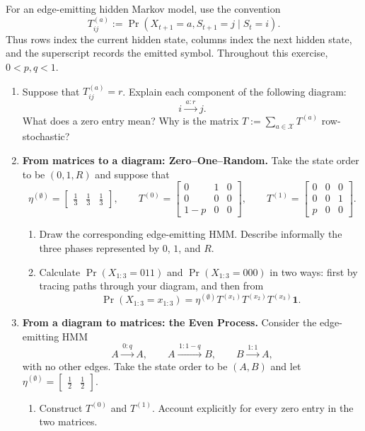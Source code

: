 \begin{exercise}
\label{ex:p3-1}
  For an edge-emitting hidden Markov model, use the convention
  \[
    T^{(a)}_{ij}
      :=\Pr(X_{t+1}=a,S_{t+1}=j\mid S_t=i).
  \]
  Thus rows index the current hidden state, columns index the next hidden
  state, and the superscript records the emitted symbol. Throughout this
  exercise, $0<p,q<1$.

  \begin{enumerate}
    \item Suppose that $T^{(a)}_{ij}=r$. Explain each component of the
      following diagram:
      \[
        i\xrightarrow{\,a:r\,}j.
      \]
      What does a zero entry mean? Why is the matrix
      $T:=\sum_{a\in\mathcal X}T^{(a)}$ row-stochastic?

    \item \textbf{From matrices to a diagram: Zero--One--Random.}
      Take the state order to be $(0,1,R)$ and suppose that
      \[
        \eta^{(\emptyset)}
          =\begin{bmatrix}\tfrac13&\tfrac13&\tfrac13\end{bmatrix},
        \qquad
        T^{(0)}=
        \begin{bmatrix}
          0&1&0\\
          0&0&0\\
          1-p&0&0
        \end{bmatrix},
        \qquad
        T^{(1)}=
        \begin{bmatrix}
          0&0&0\\
          0&0&1\\
          p&0&0
        \end{bmatrix}.
      \]
      \begin{enumerate}
        \item Draw the corresponding edge-emitting HMM. Describe informally
          the three phases represented by $0$, $1$, and $R$.

        \item Calculate $\Pr(X_{1:3}=011)$ and
          $\Pr(X_{1:3}=000)$ in two ways: first by tracing paths through your
          diagram, and then from
          \[
            \Pr(X_{1:3}=x_{1:3})
              =\eta^{(\emptyset)}
                T^{(x_1)}T^{(x_2)}T^{(x_3)}\mathbf 1.
          \]
      \end{enumerate}

    \item \textbf{From a diagram to matrices: the Even Process.}
      Consider the edge-emitting HMM
      \[
        A\xrightarrow{\,0:q\,}A,
        \qquad
        A\xrightarrow{\,1:1-q\,}B,
        \qquad
        B\xrightarrow{\,1:1\,}A,
      \]
      with no other edges. Take the state order to be $(A,B)$ and let
      $\eta^{(\emptyset)}=\begin{bmatrix}\tfrac12&\tfrac12\end{bmatrix}$.
      \begin{enumerate}
        \item Construct $T^{(0)}$ and $T^{(1)}$. Account explicitly for every
          zero entry in the two matrices.


\end{enumerate}
\end{enumerate}
\end{exercise}
